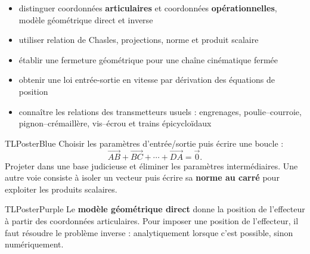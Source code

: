 \documentclass[10pt,a3paper]{article}
\begin{document}
\vspace{2mm}
\begin{minipage}[t]{0.61\linewidth}
\begin{TLPosterSavoirs}
\begin{itemize}
  \item distinguer coordonnées \textbf{articulaires} et coordonnées \textbf{opérationnelles}, modèle géométrique direct et inverse
  \item utiliser relation de Chasles, projections, norme et produit scalaire
  \item établir une fermeture géométrique pour une chaîne cinématique fermée
  \item obtenir une loi entrée-sortie en vitesse par dérivation des équations de position
  \item connaître les relations des transmetteurs usuels : engrenages, poulie--courroie, pignon--crémaillère, vis--écrou et trains épicycloïdaux
\end{itemize}
\end{TLPosterSavoirs}
\end{minipage}\hfill
\begin{minipage}[t]{0.36\linewidth}
\end{minipage}
\vfill
\begin{minipage}[t]{0.49\linewidth}
\begin{TLPosterBloc}{TLPosterBlue}
Choisir les paramètres d'entrée/sortie puis écrire une boucle :
\[
\overrightarrow{AB}+\overrightarrow{BC}+\cdots+\overrightarrow{DA}=\vec 0.
\]
Projeter dans une base judicieuse et éliminer les paramètres intermédiaires. Une autre voie consiste à isoler un vecteur puis écrire sa \textbf{norme au carré} pour exploiter les produits scalaires.
\end{TLPosterBloc}
\begin{TLPosterBloc}{TLPosterPurple}
Le \textbf{modèle géométrique direct} donne la position de l'effecteur à partir des coordonnées articulaires. Pour imposer une position de l'effecteur, il faut résoudre le problème inverse : analytiquement lorsque c'est possible, sinon numériquement.
\end{TLPosterBloc}
\end{minipage}\hfill
\end{document}
